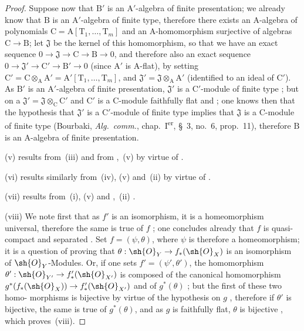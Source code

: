 \begin{proof}
Suppose now that $\mathrm{B}'$ is an $\mathrm{A}'$-algebra of finite presentation; we already know
that $\mathrm{B}$ is an $\mathrm{A}'$-algebra of finite type, therefore there exists an $\mathrm{A}$-algebra
of polynomials $\mathrm{C}=\mathrm{A}[\mathrm{T}_1,\ldots,\mathrm{T}_m]$ and an $\mathrm{A}$-homomorphism surjective of algebras $\mathrm{C}\to\mathrm{B}$;
let $\mathfrak{J}$ be the kernel of this homomorphism, so that we have an exact sequence
$0\to\mathfrak{J}\to\mathrm{C}\to\mathrm{B}\to 0$, and therefore also an exact sequence $0\to\mathfrak{J}'\to\mathrm{C}'\to\mathrm{B}'\to 0$ (since $\mathrm{A}'$
is $\mathrm{A}$-flat), by setting $\mathrm{C}'=\mathrm{C}\otimes_{\mathrm{A}}\mathrm{A}'=\mathrm{A}'[\mathrm{T}_1,\ldots,\mathrm{T}_m]$, and $\mathfrak{J}'=\mathfrak{J}\otimes_{\mathrm{A}}\mathrm{A}'$ (identified to an
ideal of $\mathrm{C}'$). As $\mathrm{B}'$ is an $\mathrm{A}'$-algebra of finite presentation, $\mathfrak{J}'$ is a $\mathrm{C}'$-module
of finite type ; but on a $\mathfrak{J}'=\mathfrak{J}\otimes_{\mathrm{C}}\mathrm{C}'$ and $\mathrm{C}'$ is a $\mathrm{C}$-module faithfully flat
 and ; one knows then that the hypothesis that $\mathfrak{J}'$ is a $\mathrm{C}'$-module of finite type
implies that $\mathfrak{J}$ is a $\mathrm{C}$-module of finite type (Bourbaki, \emph{Alg.\ comm.}, chap.~I\textsuperscript{er}, \S~3, no.~6,
prop.~11), therefore $\mathrm{B}$ is an $\mathrm{A}$-algebra of finite presentation.

(v) results from~(iii) and from ,~(v) by virtue of .

(vi) results similarly from~(iv), (v) and~(ii) by virtue of .

(vii) results from~(i), (v) and ,~(ii) .

(viii) We note first that as $f'$ is an isomorphism, it is a homeomorphism
universal, therefore the same is true of $f$ ; one concludes already that $f$ is
quasi-compact and separated . Set $f=(\psi,\theta)$, where $\psi$ is therefore a homeomorphism;
it is a question of proving that $\theta:\sh{O}_Y\to f_*(\sh{O}_X)$ is an isomorphism of $\sh{O}_Y$-Modules. Or, if one
sets $f'=(\psi',\theta')$, the homomorphism $\theta':\sh{O}_{Y'}\to f'_*(\sh{O}_{X'})$ is composed of the
canonical homomorphism $g^*(f_*(\sh{O}_X))\to f'_*(\sh{O}_{X'})$ and of $g^*(\theta)$ ; but the first of these two homo-
morphisms is bijective by virtue of the hypothesis on $g$ , therefore if $\theta'$ is bijective,
the same is true of $g^*(\theta)$, and as $g$ is faithfully flat, $\theta$ is bijective , which
proves~(viii).


\end{proof}
